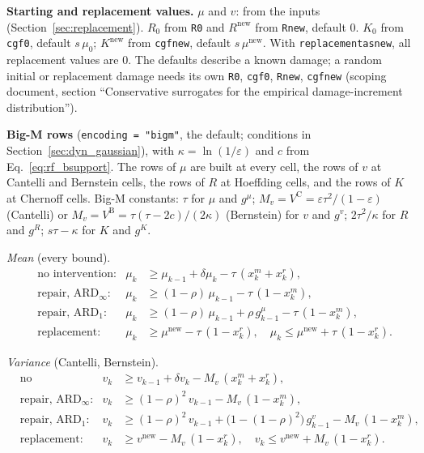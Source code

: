 \documentclass[11pt,a4paper]{article}
\theoremstyle{plain}
\theoremstyle{definition}
\newcommand{\ARDinf}{\mathrm{ARD}_{\infty}}
\newcommand{\ARDone}{\mathrm{ARD}_{1}}
\newcommand{\new}{\mathrm{new}}
\renewcommand{\_}{\textunderscore\allowbreak{}}
\begin{document}
\textbf{Starting and replacement values.} $\mu$ and $v$: from the inputs
(Section~\ref{sec:replacement}). $R_0$ from \texttt{R\_0} and $R^{\new}$ from
\texttt{R\_new}, default 0. $K_0$ from \texttt{cgf\_0}, default $s\,\mu_0$;
$K^{\new}$ from \texttt{cgf\_new}, default $s\,\mu^{\new}$. With
\texttt{replacement\_as\_new}, all replacement values are 0. The defaults describe a
known damage; a random initial or replacement damage needs its own \texttt{R\_0},
\texttt{cgf\_0}, \texttt{R\_new}, \texttt{cgf\_new} (scoping document, section
``Conservative surrogates for the empirical damage-increment distribution'').

\textbf{Big-M rows} (\texttt{encoding = "bigm"}, the default; conditions in
Section~\ref{sec:dyn_gaussian}), with $\kappa = \ln(1/\varepsilon)$ and $c$ from
Eq.~\eqref{eq:rf_bsupport}. The rows of $\mu$ are built at every cell, the rows of
$v$ at Cantelli and Bernstein cells, the rows of $R$ at Hoeffding cells, and the rows
of $K$ at Chernoff cells. Big-M constants: $\tau$ for $\mu$ and $g^{\mu}$;
$M_v = V^{\mathrm{C}} = \varepsilon\tau^2/(1-\varepsilon)$ (Cantelli) or
$M_v = V^{\mathrm{B}} = \tau(\tau - 2c)/(2\kappa)$ (Bernstein) for $v$ and $g^{v}$;
$2\tau^2/\kappa$ for $R$ and $g^{R}$; $s\tau - \kappa$ for $K$ and $g^{K}$.

\emph{Mean} (every bound).
\begin{align}
  &\text{no intervention:} & \mu_k &\geq \mu_{k-1} + \delta\mu_k - \tau\,(x^m_k + x^r_k),
    \label{eq:rf_mu_carry} \\
  &\text{repair, } \ARDinf\text{:} & \mu_k &\geq (1-\rho)\,\mu_{k-1} - \tau\,(1 - x^m_k),
    \label{eq:rf_mu_inf} \\
  &\text{repair, } \ARDone\text{:} & \mu_k &\geq (1-\rho)\,\mu_{k-1} + \rho\, g^{\mu}_{k-1}
    - \tau\,(1 - x^m_k),
    \label{eq:rf_mu_one} \\
  &\text{replacement:} & \mu_k &\geq \mu^{\new} - \tau\,(1 - x^r_k), \quad
    \mu_k \leq \mu^{\new} + \tau\,(1 - x^r_k).
    \label{eq:rf_mu_repl}
\end{align}

\emph{Variance} (Cantelli, Bernstein).
\begin{align}
  &\text{no intervention:} & v_k &\geq v_{k-1} + \delta v_k - M_v\,(x^m_k + x^r_k),
    \label{eq:rf_v_carry} \\
  &\text{repair, } \ARDinf\text{:} & v_k &\geq (1-\rho)^2\, v_{k-1} - M_v\,(1 - x^m_k),
    \label{eq:rf_v_inf} \\
  &\text{repair, } \ARDone\text{:} & v_k &\geq (1-\rho)^2\, v_{k-1}
    + \bigl(1 - (1-\rho)^2\bigr)\, g^{v}_{k-1} - M_v\,(1 - x^m_k),
    \label{eq:rf_v_one} \\
  &\text{replacement:} & v_k &\geq v^{\new} - M_v\,(1 - x^r_k), \quad
    v_k \leq v^{\new} + M_v\,(1 - x^r_k).
    \label{eq:rf_v_repl}
\end{align}
\end{document}
